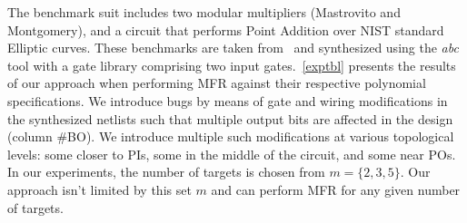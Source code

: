 


The benchmark suit includes two modular multipliers (Mastrovito and Montgomery), and 
a circuit that performs Point Addition over NIST standard Elliptic curves.
These benchmarks are taken from~\cite{lv:tcad2013} and synthesized using the {\it abc} tool 
with a gate library comprising two input gates.~\autoref{exptbl} presents the results 
of our approach when performing MFR against their respective polynomial specifications. 
We introduce bugs by means of gate and wiring modifications in the synthesized 
netlists such that multiple output bits are affected in the design (column \#BO). 
We introduce multiple such modifications at various topological levels:
some closer to PIs, some in the middle of the circuit, and some near POs. 
In our experiments, the number of targets is 
chosen from $m=\{2,3,5\}$. 
Our approach isn't limited by this set $m$ and can perform MFR
for any given number of targets.

